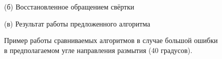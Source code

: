 \begin{figure}[H]
\begin{minipage}[t]{0.3\linewidth}
(б) Восстановленное обращением свёртки\\ 
\end{minipage}
\hfill
\begin{minipage}[t]{0.3\linewidth}
(в) Результат работы предложенного алгоритма\\ 
\end{minipage}
\caption{ Пример работы сравниваемых алгоритмов в случае большой ошибки в предполагаемом угле направления размытия (40 градусов). }
\label{ris:Wrong_angle}
\end{figure}

